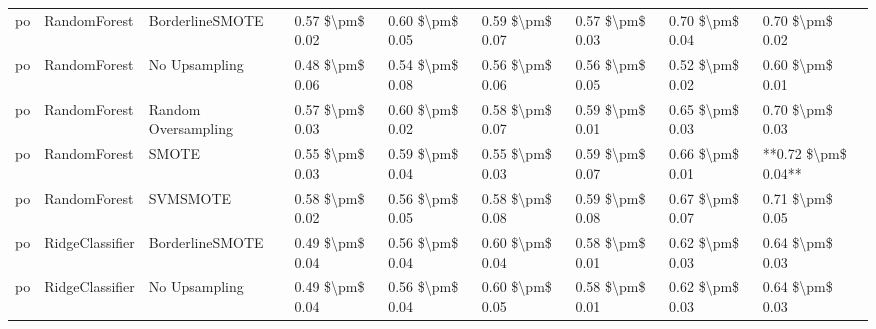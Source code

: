 \begin{tabular}{lllllllll}
      po &                    RandomForest &               BorderlineSMOTE & 0.57 \$\textbackslash pm\$ 0.02 &           0.60 \$\textbackslash pm\$ 0.05 &       0.59 \$\textbackslash pm\$ 0.07 &        0.57 \$\textbackslash pm\$ 0.03 &                         0.70 \$\textbackslash pm\$ 0.04 &     0.70 \$\textbackslash pm\$ 0.02 \\
      po &                    RandomForest &                 No Upsampling & 0.48 \$\textbackslash pm\$ 0.06 &           0.54 \$\textbackslash pm\$ 0.08 &       0.56 \$\textbackslash pm\$ 0.06 &        0.56 \$\textbackslash pm\$ 0.05 &                         0.52 \$\textbackslash pm\$ 0.02 &     0.60 \$\textbackslash pm\$ 0.01 \\
      po &                    RandomForest &           Random Oversampling & 0.57 \$\textbackslash pm\$ 0.03 &           0.60 \$\textbackslash pm\$ 0.02 &       0.58 \$\textbackslash pm\$ 0.07 &        0.59 \$\textbackslash pm\$ 0.01 &                         0.65 \$\textbackslash pm\$ 0.03 &     0.70 \$\textbackslash pm\$ 0.03 \\
      po &                    RandomForest &                         SMOTE & 0.55 \$\textbackslash pm\$ 0.03 &           0.59 \$\textbackslash pm\$ 0.04 &       0.55 \$\textbackslash pm\$ 0.03 &        0.59 \$\textbackslash pm\$ 0.07 &                         0.66 \$\textbackslash pm\$ 0.01 & **0.72 \$\textbackslash pm\$ 0.04** \\
      po &                    RandomForest &                      SVMSMOTE & 0.58 \$\textbackslash pm\$ 0.02 &           0.56 \$\textbackslash pm\$ 0.05 &       0.58 \$\textbackslash pm\$ 0.08 &        0.59 \$\textbackslash pm\$ 0.08 &                         0.67 \$\textbackslash pm\$ 0.07 &     0.71 \$\textbackslash pm\$ 0.05 \\
      po &                 RidgeClassifier &               BorderlineSMOTE & 0.49 \$\textbackslash pm\$ 0.04 &           0.56 \$\textbackslash pm\$ 0.04 &       0.60 \$\textbackslash pm\$ 0.04 &        0.58 \$\textbackslash pm\$ 0.01 &                         0.62 \$\textbackslash pm\$ 0.03 &     0.64 \$\textbackslash pm\$ 0.03 \\
      po &                 RidgeClassifier &                 No Upsampling & 0.49 \$\textbackslash pm\$ 0.04 &           0.56 \$\textbackslash pm\$ 0.04 &       0.60 \$\textbackslash pm\$ 0.05 &        0.58 \$\textbackslash pm\$ 0.01 &                         0.62 \$\textbackslash pm\$ 0.03 &     0.64 \$\textbackslash pm\$ 0.03 \\

\end{tabular}
